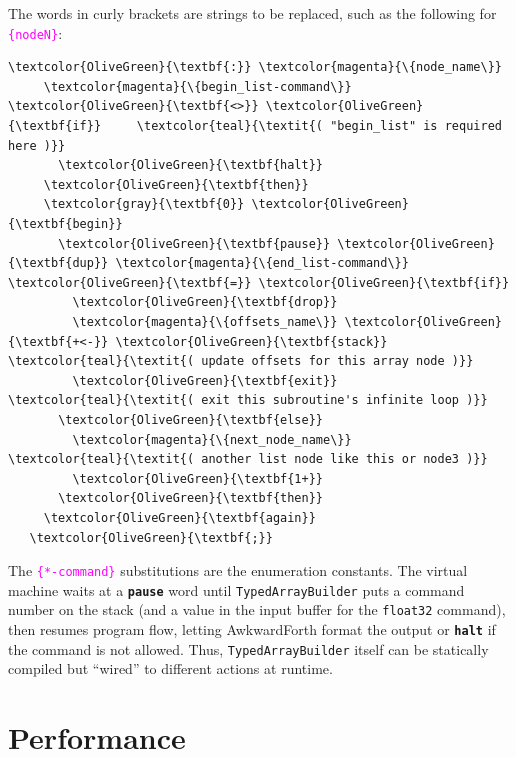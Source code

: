 \documentclass{webofc}
\begin{document}
\noindent The words in curly brackets are strings to be replaced, such as the following for \textcolor{magenta}{\tt \{nodeN\}}:

\small
\begin{Verbatim}[commandchars=\\\{\}]
   \textcolor{OliveGreen}{\textbf{:}} \textcolor{magenta}{\{node_name\}}
     \textcolor{magenta}{\{begin_list-command\}} \textcolor{OliveGreen}{\textbf{<>}} \textcolor{OliveGreen}{\textbf{if}}     \textcolor{teal}{\textit{( "begin_list" is required here )}}
       \textcolor{OliveGreen}{\textbf{halt}}
     \textcolor{OliveGreen}{\textbf{then}}
     \textcolor{gray}{\textbf{0}} \textcolor{OliveGreen}{\textbf{begin}}
       \textcolor{OliveGreen}{\textbf{pause}} \textcolor{OliveGreen}{\textbf{dup}} \textcolor{magenta}{\{end_list-command\}} \textcolor{OliveGreen}{\textbf{=}} \textcolor{OliveGreen}{\textbf{if}}
         \textcolor{OliveGreen}{\textbf{drop}}
         \textcolor{magenta}{\{offsets_name\}} \textcolor{OliveGreen}{\textbf{+<-}} \textcolor{OliveGreen}{\textbf{stack}}   \textcolor{teal}{\textit{( update offsets for this array node )}}
         \textcolor{OliveGreen}{\textbf{exit}}                       \textcolor{teal}{\textit{( exit this subroutine's infinite loop )}}
       \textcolor{OliveGreen}{\textbf{else}}
         \textcolor{magenta}{\{next_node_name\}}           \textcolor{teal}{\textit{( another list node like this or node3 )}}
         \textcolor{OliveGreen}{\textbf{1+}}
       \textcolor{OliveGreen}{\textbf{then}}
     \textcolor{OliveGreen}{\textbf{again}}
   \textcolor{OliveGreen}{\textbf{;}}
\end{Verbatim}
\normalsize

\noindent The \textcolor{magenta}{\tt \{*-command\}} substitutions are the enumeration constants. The virtual machine waits at a \textcolor{OliveGreen}{\tt\textbf{pause}} word until {\tt TypedArrayBuilder} puts a command number on the stack (and a value in the input buffer for the {\tt float32} command), then resumes program flow, letting AwkwardForth format the output or \textcolor{OliveGreen}{\tt\textbf{halt}} if the command is not allowed. Thus, {\tt TypedArrayBuilder} itself can be statically compiled but ``wired'' to different actions at runtime.

\vspace{-0.25 cm}
\section{Performance}
\label{sec:performance}
\end{document}
